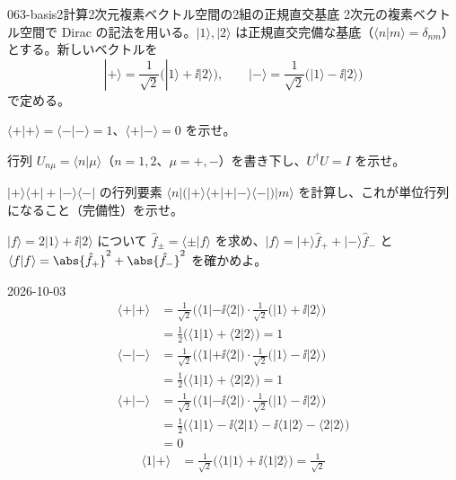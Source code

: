 \documentclass[uplatex,dvipdfmx,a4paper,11pt]{jsarticle}
\begin{document}
\begin{mondai}{063-basis2}{計算}{2次元複素ベクトル空間の2組の正規直交基底}
2次元の複素ベクトル空間で Dirac の記法を用いる。$|1\rangle,|2\rangle$ は正規直交完備な基底（$\langle n|m\rangle=\delta_{nm}$）とする。新しいベクトルを
\[
|+\rangle=\frac{1}{\sqrt{2}}\bigl(|1\rangle+\ii|2\rangle\bigr),\qquad |-\rangle=\frac{1}{\sqrt{2}}\bigl(|1\rangle-\ii|2\rangle\bigr)
\]
で定める。
\begin{shoumon}
  \item $\langle+|+\rangle=\langle-|-\rangle=1$、$\langle+|-\rangle=0$ を示せ。
  \item 行列 $U_{n\mu}=\langle n|\mu\rangle$（$n=1,2$、$\mu=+,-$）を書き下し、$U^{\dagger}U=I$ を示せ。
  \item $|+\rangle\langle+|+|-\rangle\langle-|$ の行列要素 $\langle n|\bigl(|+\rangle\langle+|+|-\rangle\langle-|\bigr)|m\rangle$ を計算し、これが単位行列になること（完備性）を示せ。
  \item $|f\rangle=2|1\rangle+\ii|2\rangle$ について $\hat{f}_{\pm}=\langle\pm|f\rangle$ を求め、$|f\rangle=|+\rangle\hat{f}_{+}+|-\rangle\hat{f}_{-}$ と $\langle f|f\rangle=\abs{\hat{f}_{+}}^{2}+\abs{\hat{f}_{-}}^{2}$ を確かめよ。
\end{shoumon}
\begin{kotaeutsushi}{2026-10-03}
\begin{align*}
  \langle+|+\rangle&=\frac{1}{\sqrt{2}}\bigl(\langle1|-\ii\langle2|\bigr)\cdot\frac{1}{\sqrt{2}}\bigl(|1\rangle+\ii|2\rangle\bigr)\\
  &=\frac{1}{2}\bigl(\langle1|1\rangle+\langle2|2\rangle\bigr)=1\\
  \langle-|-\rangle&=\frac{1}{\sqrt{2}}\bigl(\langle1|+\ii\langle2|\bigr)\cdot\frac{1}{\sqrt{2}}\bigl(|1\rangle-\ii|2\rangle\bigr)\\
  &=\frac{1}{2}\bigl(\langle1|1\rangle+\langle2|2\rangle\bigr)=1\\
  \langle+|-\rangle&=\frac{1}{\sqrt{2}}\bigl(\langle1|-\ii\langle2|\bigr)\cdot\frac{1}{\sqrt{2}}\bigl(|1\rangle-\ii|2\rangle\bigr)\\
  &=\frac{1}{2}\bigl(\langle1|1\rangle-\ii\langle2|1\rangle-\ii\langle1|2\rangle-\langle2|2\rangle\bigr)\\
  &=0
\end{align*}
\begin{align*}
  \langle1|+\rangle&=\frac{1}{\sqrt{2}}\bigl(\langle1|1\rangle+\ii\langle1|2\rangle\bigr)=\frac{1}{\sqrt{2}}\\

\end{align*}
\end{kotaeutsushi}
\end{mondai}
\end{document}
